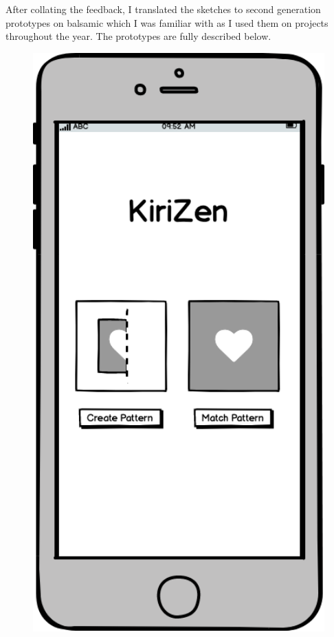 \documentclass[11pt]{article}
\begin{document}
        After collating the feedback, I translated the sketches to second generation prototypes on balsamic \cite{Balsamiq} which I was familiar with as I used them on projects throughout the year. The prototypes are fully described below. 
    
\clearpage
             \begin{figure}
                \begin{minipage}[c]{0.35\textwidth}
                \includegraphics[width=1\textwidth]{Images/Prototype/prototypeHomeScreen.png}

\end{minipage}
\end{figure}
\end{document}
